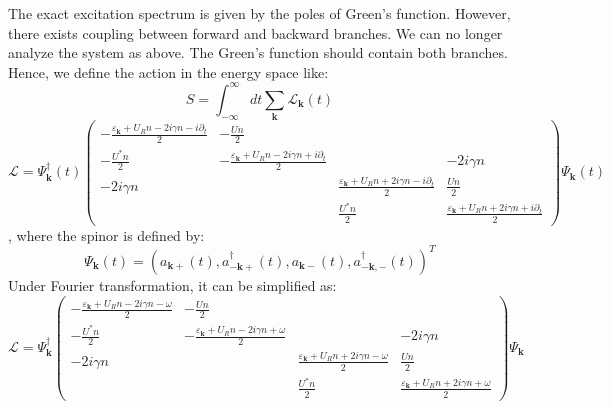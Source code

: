 \documentclass{article}
\newcommand{\tmmathbf}[1]{\ensuremath{\boldsymbol{#1}}}
\begin{document}
The exact excitation spectrum is given by the poles of Green's function.
However, there exists coupling between forward and backward branches. We can
no longer analyze the system as above. The Green's function should contain
both branches. Hence, we define the action in the energy space like:
\begin{equation}
  S = \int_{- \infty}^{\infty} d t \sum_{\tmmathbf{k}}
  \mathcal{L}_{\tmmathbf{k}} (t)
\end{equation}
\begin{equation}
  \mathcal{L}= \Psi_{\tmmathbf{k}}^{\dagger} (t) \left(\begin{array}{cccc}
    - \frac{\varepsilon_{\tmmathbf{k}} + U_R n - 2 i \gamma n - i
    \partial_t}{2} & - \frac{U n}{2} &  & \\
    - \frac{U^{\ast} n}{2} & - \frac{\varepsilon_{\tmmathbf{k}} + U_R n - 2 i
    \gamma n + i \partial_t}{2} &  & - 2 i \gamma n\\
    - 2 i \gamma n &  & \frac{\varepsilon_{\tmmathbf{k}} + U_R n + 2 i \gamma
    n - i \partial_t}{2} & \frac{U n}{2}\\
    &  & \frac{U^{\ast} n}{2} & \frac{\varepsilon_{\tmmathbf{k}} + U_R n + 2
    i \gamma n + i \partial_t}{2}
  \end{array}\right) \Psi_{\tmmathbf{k}} (t)
\end{equation}
, where the spinor is defined by:
\begin{equation}
  \Psi_{\tmmathbf{k}} (t) = (a_{\tmmathbf{k}+} (t),
  a^{\dagger}_{-\tmmathbf{k}+} (t), a_{\tmmathbf{k}-} (t),
  a^{\dagger}_{-\tmmathbf{k}, -} (t))^T
\end{equation}
Under Fourier transformation, it can be simplified as:
\begin{equation}
  \mathcal{L}= \Psi_{\tmmathbf{k}}^{\dagger} \left(\begin{array}{cccc}
    - \frac{\varepsilon_{\tmmathbf{k}} + U_R n - 2 i \gamma n - \omega}{2} & -
    \frac{U n}{2} &  & \\
    - \frac{U^{\ast} n}{2} & - \frac{\varepsilon_{\tmmathbf{k}} + U_R n - 2 i
    \gamma n + \omega}{2} &  & - 2 i \gamma n\\
    - 2 i \gamma n &  & \frac{\varepsilon_{\tmmathbf{k}} + U_R n + 2 i \gamma
    n - \omega}{2} & \frac{U n}{2}\\
    &  & \frac{U^{\ast} n}{2} & \frac{\varepsilon_{\tmmathbf{k}} + U_R n + 2
    i \gamma n + \omega}{2}
  \end{array}\right) \Psi_{\tmmathbf{k}}
\end{equation}
\end{document}
